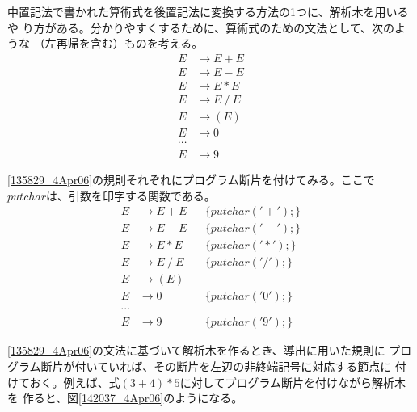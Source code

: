 中置記法で書かれた算術式を後置記法に変換する方法の1つに、解析木を用いるや
り方がある。分かりやすくするために、算術式のための文法として、次のような
（左再帰を含む）ものを考える。
\begin{equation}
\begin{split}
 E & \rightarrow E + E \\
 E & \rightarrow E - E \\
 E & \rightarrow E \ast E \\
 E & \rightarrow E\ /\ E \\
 E & \rightarrow (E) \\
 E & \rightarrow 0 \\
 \cdots \\
 E & \rightarrow 9
\end{split}\label{135829_4Apr06}
\end{equation}

\eqref{135829_4Apr06}の規則それぞれにプログラム断片を付けてみる。ここで
$putchar$は、引数を印字する関数である。
\begin{align*}
 E & \rightarrow E + E && \{ putchar('+'); \} \\
 E & \rightarrow E - E & & \{ putchar('-'); \} \\
 E & \rightarrow E \ast E & & \{ putchar('\ast'); \} \\
 E & \rightarrow E \ / \ E & & \{ putchar('/'); \} \\
 E & \rightarrow (E) & & \\ 
 E & \rightarrow 0 & & \{ putchar('0'); \} \\
 \cdots \\
 E & \rightarrow 9 & & \{ putchar('9'); \}
\end{align*}

\eqref{135829_4Apr06}の文法に基づいて解析木を作るとき、導出に用いた規則に
プログラム断片が付いていれば、その断片を左辺の非終端記号に対応する節点に
付けておく。例えば、式$(3+4)*5$に対してプログラム断片を付けながら解析木を
作ると、図\ref{142037_4Apr06}のようになる。

